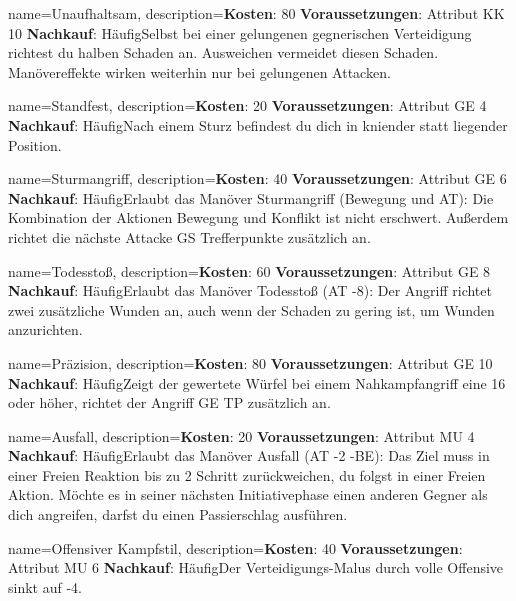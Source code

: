 {
    name={Unaufhaltsam},
    description={\textbf{Kosten}: 80 \textbf{Voraussetzungen}: Attribut KK 10 \textbf{Nachkauf}: Häufig\newline Selbst bei einer gelungenen gegnerischen Verteidigung richtest du halben Schaden an. Ausweichen vermeidet diesen Schaden. Manövereffekte wirken weiterhin nur bei gelungenen Attacken.}
}


{
    name={Standfest},
    description={\textbf{Kosten}: 20 \textbf{Voraussetzungen}: Attribut GE 4 \textbf{Nachkauf}: Häufig\newline Nach einem Sturz befindest du dich in kniender statt liegender Position.}
}


{
    name={Sturmangriff},
    description={\textbf{Kosten}: 40 \textbf{Voraussetzungen}: Attribut GE 6 \textbf{Nachkauf}: Häufig\newline Erlaubt das Manöver Sturmangriff (Bewegung und AT): Die Kombination der Aktionen Bewegung und Konflikt ist nicht erschwert. Außerdem richtet die nächste Attacke GS Trefferpunkte zusätzlich an.}
}


{
    name={Todesstoß},
    description={\textbf{Kosten}: 60 \textbf{Voraussetzungen}: Attribut GE 8 \textbf{Nachkauf}: Häufig\newline Erlaubt das Manöver Todesstoß (AT -8): Der Angriff richtet zwei zusätzliche Wunden an, auch wenn der Schaden zu gering ist, um Wunden anzurichten.}
}


{
    name={Präzision},
    description={\textbf{Kosten}: 80 \textbf{Voraussetzungen}: Attribut GE 10 \textbf{Nachkauf}: Häufig\newline Zeigt der gewertete Würfel bei einem Nahkampfangriff eine 16 oder höher, richtet der Angriff GE TP zusätzlich an.}
}


{
    name={Ausfall},
    description={\textbf{Kosten}: 20 \textbf{Voraussetzungen}: Attribut MU 4 \textbf{Nachkauf}: Häufig\newline Erlaubt das Manöver Ausfall (AT -2 -BE): Das Ziel muss in einer Freien Reaktion bis zu 2 Schritt zurückweichen, du folgst in einer Freien Aktion. Möchte es in seiner nächsten Initiativephase einen anderen Gegner als dich angreifen, darfst du einen Passierschlag ausführen.}
}


{
    name={Offensiver Kampfstil},
    description={\textbf{Kosten}: 40 \textbf{Voraussetzungen}: Attribut MU 6 \textbf{Nachkauf}: Häufig\newline Der Verteidigungs-Malus durch volle Offensive sinkt auf -4.}
}


